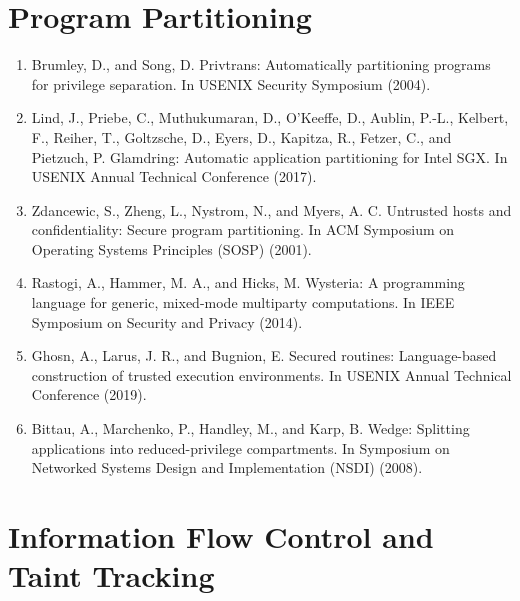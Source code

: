 \section{Program Partitioning} 

\begin{enumerate}[resume]
\item  Brumley, D., and Song, D. Privtrans: Automatically partitioning programs for privilege separation. In USENIX Security Symposium (2004).
\item  Lind, J., Priebe, C., Muthukumaran, D., O’Keeffe, D., Aublin, P.-L., Kelbert, F., Reiher, T., Goltzsche, D., Eyers, D., Kapitza, R., Fetzer, C., and Pietzuch, P. Glamdring: Automatic application partitioning for Intel SGX. In USENIX Annual Technical Conference (2017).
\item  Zdancewic, S., Zheng, L., Nystrom, N., and Myers, A. C. Untrusted hosts and confidentiality: Secure program partitioning. In ACM Symposium on Operating Systems Principles (SOSP) (2001).
\item  Rastogi, A., Hammer, M. A., and Hicks, M. Wysteria: A programming language for generic, mixed-mode multiparty computations. In IEEE Symposium on Security and Privacy (2014).
\item Ghosn, A., Larus, J. R., and Bugnion, E. Secured routines: Language-based construction of trusted execution environments. In USENIX Annual Technical Conference (2019).
\item Bittau, A., Marchenko, P., Handley, M., and Karp, B. Wedge: Splitting applications into reduced-privilege compartments. In Symposium on Networked Systems Design and Implementation (NSDI) (2008).
\end{enumerate}

\section{Information Flow Control and Taint Tracking}

